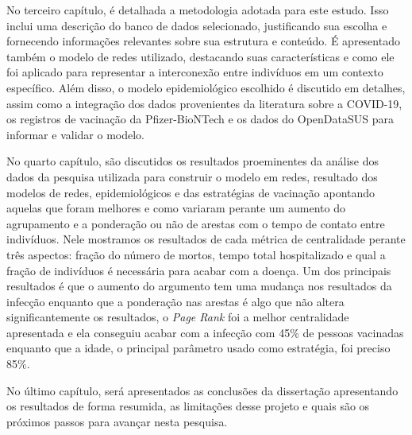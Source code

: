 No terceiro capítulo, é detalhada a metodologia adotada para este estudo. Isso inclui uma descrição do banco de dados selecionado, justificando sua escolha e fornecendo informações relevantes sobre sua estrutura e conteúdo. É apresentado também o modelo de redes utilizado, destacando suas características e como ele foi aplicado para representar a interconexão entre indivíduos em um contexto específico. Além disso, o modelo epidemiológico escolhido é discutido em detalhes, assim como a integração dos dados provenientes da literatura sobre a COVID-19, os registros de vacinação da Pfizer-BioNTech e os dados do OpenDataSUS para informar e validar o modelo.

No quarto capítulo, são discutidos os resultados proeminentes da análise dos dados da pesquisa utilizada para construir o modelo em redes, resultado dos modelos de redes, epidemiológicos e das estratégias de vacinação apontando aquelas que foram melhores e como variaram perante um aumento do agrupamento e a ponderação ou não de arestas com o tempo de contato entre indivíduos. Nele mostramos os resultados de cada métrica de centralidade perante três aspectos: fração do número de mortos, tempo total hospitalizado e qual a fração de indivíduos é necessária para acabar com a doença. Um dos principais resultados é que o aumento do argumento tem uma mudança nos resultados da infecção enquanto que a ponderação nas arestas é algo que não altera significantemente os resultados, o \textit{Page Rank} foi a melhor centralidade apresentada e ela conseguiu acabar com a infecção com 45\% de pessoas vacinadas enquanto que a idade, o principal parâmetro usado como estratégia, foi preciso 85\%.


No último capítulo, será apresentados as conclusões da dissertação apresentando os resultados de forma resumida, as limitações desse projeto e quais são  os próximos passos para avançar nesta pesquisa.
